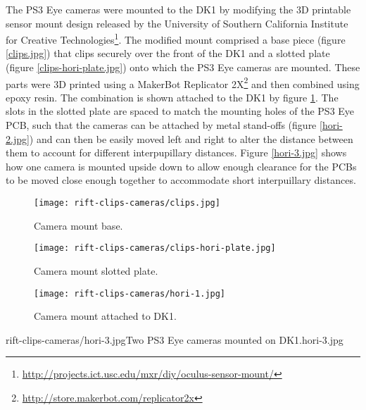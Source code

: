 The PS3 Eye cameras were mounted to the DK1 by modifying the 3D printable sensor mount design released by the University of Southern California Institute for Creative Technologies\footnote{\url{http://projects.ict.usc.edu/mxr/diy/oculus-sensor-mount/}}. The modified mount comprised a base piece (figure \ref{clips.jpg}) that clips securely over the front of the DK1 and a slotted plate (figure \ref{clips-hori-plate.jpg}) onto which the PS3 Eye cameras are mounted. These parts were 3D printed using a MakerBot Replicator 2X\footnote{\url{http://store.makerbot.com/replicator2x}} and then combined using epoxy resin. The combination is shown attached to the DK1 by figure \ref{hori-1.jpg}. The slots in the slotted plate are spaced to match the mounting holes of the PS3 Eye PCB, such that the cameras can be attached by metal stand-offs (figure \ref{hori-2.jpg}) and can then be easily moved left and right to alter the distance between them to account for different interpupillary distances. Figure \ref{hori-3.jpg} shows how one camera is mounted upside down to allow enough clearance for the PCBs to be moved close enough together to accommodate short interpuillary distances.

\begin{figure}[h]
    \centering
    \begin{minipage}{.32\textwidth}
        \centering
        \texttt{[image: rift-clips-cameras/clips.jpg]}
        \caption{Camera mount base.}
        \label{clips.jpg}
    \end{minipage}%
    \hspace{.01\textwidth}
    \begin{minipage}{0.32\textwidth}
        \centering
        \texttt{[image: rift-clips-cameras/clips-hori-plate.jpg]}
        \caption{Camera mount slotted plate.}
        \label{clips-hori-plate.jpg}
    \end{minipage}%
    \hspace{.01\textwidth}
    \begin{minipage}{0.32\textwidth}
        \centering
        \texttt{[image: rift-clips-cameras/hori-1.jpg]}
        \caption{Camera mount attached to DK1.}
        \label{hori-1.jpg}
    \end{minipage}
\end{figure}

       {rift-clips-cameras/hori-3.jpg}{Two PS3 Eye cameras mounted on DK1.}{hori-3.jpg}

